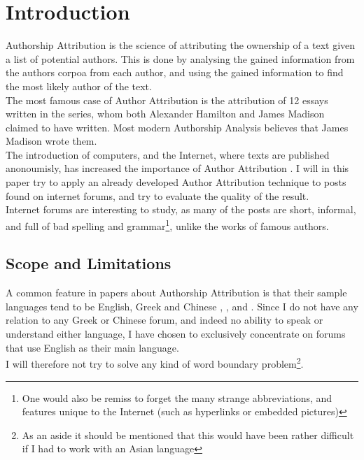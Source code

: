 \section{Introduction}
\label{introduction}
Authorship Attribution is the science of attributing the ownership of a text given a list of potential authors. This is done by analysing the gained information from the authors corpoa from each author, and using the gained information to find the most likely author of the text.\\

The most famous case of Author Attribution is the attribution of 12 essays written in the  series, whom both Alexander Hamilton and James Madison claimed to have written. Most modern Authorship Analysis believes that James Madison wrote them.  \\
 The introduction of computers, and the Internet, where texts are published anonoumisly, has increased the importance of Author Attribution . I will in this paper try to apply an already developed Author Attribution technique to posts found on internet forums, and try to evaluate the quality of the result.\\

Internet forums are interesting to study,  as many of the posts are short, informal, and full of bad spelling and grammar\footnote{One would also be remiss to forget the many strange abbreviations, and features unique to the Internet (such as hyperlinks or embedded pictures)}, unlike the works of famous authors. 

\subsection{Scope and Limitations}
\label{scope}
A common feature in papers about Authorship Attribution is that their sample languages tend to be English, Greek and Chinese \cite{syntactic}, \cite{nr2}, \cite{nr4} and \cite{app-spe}. Since I do not have any relation to any Greek or Chinese forum, and indeed no ability to speak or understand either language, I have chosen to exclusively concentrate on forums that use English as their main language.\\
I will therefore not try to solve any kind of word boundary problem\footnote{As an aside it should be mentioned that this would have been rather difficult if I had to work with an Asian language}.

